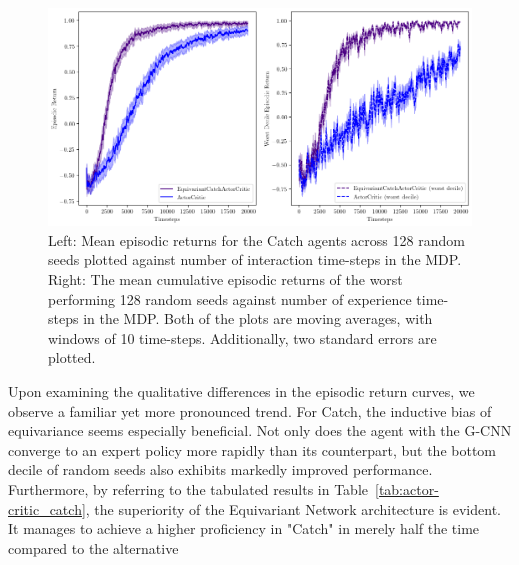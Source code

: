\begin{figure}
	\centering
	\includegraphics[width=\linewidth]{Figures/catch_returns.png}
	\caption{Left: Mean episodic returns for the Catch agents across 128 random seeds plotted against number of interaction time-steps in the MDP. Right: The mean cumulative episodic returns of the worst performing 128 random seeds against number of experience time-steps in the MDP. Both of the plots are moving averages, with windows of 10 time-steps. Additionally, two standard errors are plotted.}
\end{figure}
Upon examining the qualitative differences in the episodic return curves, we observe a familiar yet more pronounced trend. For Catch, the inductive bias of equivariance seems especially beneficial. Not only does the agent with the G-CNN converge to an expert policy more rapidly than its counterpart, but the bottom decile of random seeds also exhibits markedly improved performance. Furthermore, by referring to the tabulated results in Table~\ref{tab:actor-critic_catch}, the superiority of the Equivariant Network architecture is evident. It manages to achieve a higher proficiency in "Catch" in merely half the time compared to the alternative

